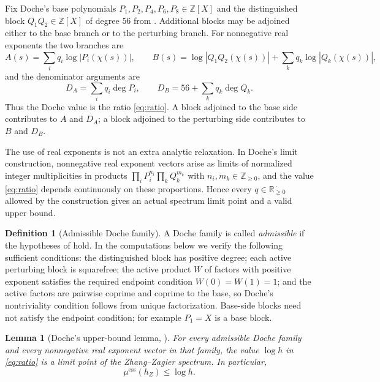\documentclass[11pt,reqno]{amsart}
\theoremstyle{plain}
\newtheorem{lemma}[theorem]{Lemma}
\theoremstyle{definition}
\newtheorem{definition}[theorem]{Definition}
\theoremstyle{remark}
\newcommand{\Z}{\mathbb{Z}}
\newcommand{\R}{\mathbb{R}}
\newcommand{\hZ}{h_Z}
\newcommand{\essmin}{\mu^{\mathrm{ess}}(\hZ)}
\newcommand{\dA}{D_A}
\newcommand{\dB}{D_B}
\begin{document}
Fix Doche's base polynomials $P_1,P_2,P_4,P_6,P_8\in\Z[X]$ and the distinguished
block $Q_1Q_2\in\Z[X]$ of degree $56$ from \citet{Doc01b}.  Additional blocks may be
adjoined either to the base branch or to the perturbing branch.  For nonnegative real
exponents the two branches are
\begin{equation}\label{eq:AB}
  A(s)=\sum_i q_i\log|P_i(\chi(s))|,
  \qquad
  B(s)=\log|Q_1Q_2(\chi(s))|+
       \sum_k q_k\log|Q_k(\chi(s))|,
\end{equation}
and the denominator arguments are
\begin{equation}\label{eq:Dformula}
  \dA=\sum_i q_i\deg P_i,
  \qquad
  \dB=56+\sum_k q_k\deg Q_k .
\end{equation}
Thus the Doche value is the ratio \eqref{eq:ratio}.  A block adjoined to the base side
contributes to $A$ and $\dA$; a block adjoined to the perturbing side contributes to
$B$ and $\dB$.

The use of real exponents is not an extra analytic relaxation.  In Doche's limit
construction, nonnegative real exponent vectors arise as limits of normalized integer
multiplicities in products
$\prod_i P_i^{n_i}\prod_k Q_k^{m_k}$ with $n_i,m_k\in\Z_{\ge0}$, and the value
\eqref{eq:ratio} depends continuously on these proportions.  Hence every
$q\in\R_{\ge0}^{\,\cdot}$ allowed by the construction gives an actual spectrum
limit point and a valid upper bound.

\begin{definition}[Admissible Doche family]\label{def:admissible}
A Doche family is called \emph{admissible} if the hypotheses of
\citet[Lemmas 2--5]{Doc01a} hold.  In the computations below we verify the following
sufficient conditions: the distinguished block has positive degree; each active
perturbing block is squarefree; the active product $W$ of factors with positive
exponent satisfies the required endpoint condition $W(0)=W(1)=1$; and the active
factors are pairwise coprime and coprime to the base, so Doche's nontriviality
condition follows from unique factorization.  Base-side blocks need not satisfy the
endpoint condition; for example $P_1=X$ is a base block.
\end{definition}

\begin{lemma}[Doche's upper-bound lemma, \citealp{Doc01a,Doc01b}]\label{lem:doche}
For every admissible Doche family and every nonnegative real exponent vector in that
family, the value $\log h$ in \eqref{eq:ratio} is a limit point of the
Zhang--Zagier spectrum.  In particular,
\[
  \essmin\le \log h .
\]
\end{lemma}
\end{document}
